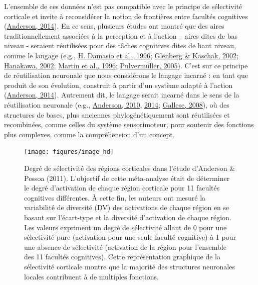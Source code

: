 \documentclass[
  a4paper,12pt,twoside,onecolumn,openright,final,oldfontcommands]{memoir}
\begin{document}
L'ensemble de ces données n'est pas compatible avec le principe de sélectivité corticale et invite à reconsidérer la notion de frontières entre facultés cognitives (\protect\hyperlink{ref-anderson_after_2014}{Anderson, 2014}). En ce sens, plusieurs études ont montré que des aires traditionnellement associées à la perception et à l'action -- aires dites de bas niveau - seraient réutilisées pour des tâches cognitives dites de haut niveau, comme le langage (e.g., \protect\hyperlink{ref-damasio_neural_1996}{H. Damasio et al., 1996}; \protect\hyperlink{ref-glenberg_grounding_2002}{Glenberg \& Kaschak, 2002}; \protect\hyperlink{ref-hanakawa_role_2002}{Hanakawa, 2002}; \protect\hyperlink{ref-martin_neural_1996}{Martin et al., 1996}; \protect\hyperlink{ref-pulvermuller_brain_2005}{Pulvermüller, 2005}). C'est sur ce principe de réutilisation neuronale que nous considérons le langage incarné : en tant que produit de son évolution, construit à partir d'un système adapté à l'action (\protect\hyperlink{ref-anderson_after_2014}{Anderson, 2014}). Autrement dit, le langage serait incarné dans le sens de la réutilisation neuronale (e.g., \protect\hyperlink{ref-anderson_neural_2010}{Anderson, 2010}, \protect\hyperlink{ref-anderson_after_2014}{2014}; \protect\hyperlink{ref-gallese_mirror_2008}{Gallese, 2008}), où des structures de bases, plus anciennes phylogénétiquement sont réutilisées et recombinées, comme celles du système sensorimoteur, pour soutenir des fonctions plus complexes, comme la compréhension d'un concept.

\begin{figure}[htbp!]

{\centering \texttt{[image: figures/image\_hd]} 

}

\caption{Degré de sélectivité des régions corticales dans l’étude d’Anderson \& Pessoa (2011). L’objectif de cette méta-analyse était de déterminer le degré d’activation de chaque région corticale pour 11 facultés cognitives différentes. À cette fin, les auteurs ont mesuré la variabilité de diversité (DV) des activations de chaque région en se basant sur l’écart-type et la diversité d’activation de chaque région. Les valeurs expriment un degré de sélectivité allant de 0 pour une sélectivité pure (activation pour une seule faculté cognitive) à 1 pour une absence de sélectivité (activation de la région pour l’ensemble des 11 facultés cognitives). Cette représentation graphique de la sélectivité corticale montre que la majorité des structures neuronales locales contribuent à de multiples fonctions.}\label{fig:chap1-fig2}
\end{figure}
\end{document}
